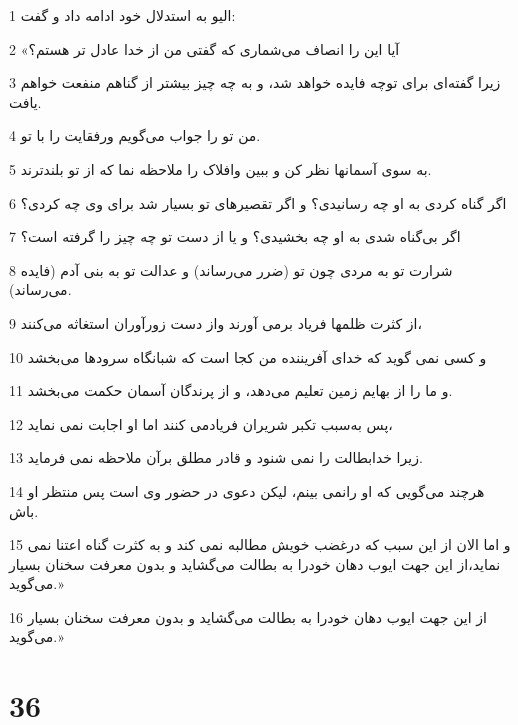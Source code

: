\par 1 الیو به استدلال خود ادامه داد و گفت:
\par 2 «آیا این را انصاف می‌شماری که گفتی من از خدا عادل تر هستم؟
\par 3 زیرا گفته‌ای برای توچه فایده خواهد شد، و به چه چیز بیشتر از گناهم منفعت خواهم یافت.
\par 4 من تو را جواب می‌گویم ورفقایت را با تو.
\par 5 به سوی آسمانها نظر کن و ببین وافلاک را ملاحظه نما که از تو بلندترند.
\par 6 اگر گناه کردی به او چه رسانیدی؟ و اگر تقصیرهای تو بسیار شد برای وی چه کردی؟
\par 7 اگر بی‌گناه شدی به او چه بخشیدی؟ و یا از دست تو چه چیز را گرفته است؟
\par 8 شرارت تو به مردی چون تو (ضرر می‌رساند) و عدالت تو به بنی آدم (فایده می‌رساند).
\par 9 از کثرت ظلمها فریاد برمی آورند واز دست زورآوران استغاثه می‌کنند،
\par 10 و کسی نمی گوید که خدای آفریننده من کجا است که شبانگاه سرودها می‌بخشد
\par 11 و ما را از بهایم زمین تعلیم می‌دهد، و از پرندگان آسمان حکمت می‌بخشد.
\par 12 پس به‌سبب تکبر شریران فریادمی کنند اما او اجابت نمی نماید،
\par 13 زیرا خدابطالت را نمی شنود و قادر مطلق برآن ملاحظه نمی فرماید.
\par 14 هرچند می‌گویی که او رانمی بینم، لیکن دعوی در حضور وی است پس منتظر او باش.
\par 15 و اما الان از این سبب که درغضب خویش مطالبه نمی کند و به کثرت گناه اعتنا نمی نماید،از این جهت ایوب دهان خودرا به بطالت می‌گشاید و بدون معرفت سخنان بسیار می‌گوید.»
\par 16 از این جهت ایوب دهان خودرا به بطالت می‌گشاید و بدون معرفت سخنان بسیار می‌گوید.»
 
\chapter{36}

